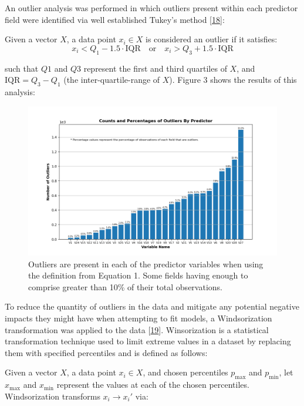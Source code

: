 \documentclass[11pt, oneside]{article}   	%
\begin{document}
An outlier analysis was performed in which outliers present within each predictor field were identified via well established Tukey's method [\href{https://books.google.com/books/about/Exploratory_Data_Analysis.html?id=UT9dAAAAIAAJ}{18}]: 

Given a vector $X$, a data point $x_i \in X$ is considered an outlier if it satisfies:
\begin{equation}
x_i < Q_1 - 1.5 \cdot \text{IQR} \quad \text{or} \quad x_i > Q_3 + 1.5 \cdot \text{IQR}
\end{equation}

such that $Q1$ and $Q3$ represent the first and third quartiles of $X$, and $\text{IQR} = Q_3 - Q_1$ (the inter-quartile-range of $X$). Figure 3 shows the results of this analysis:

\begin{figure}[h!]
    \centering
    \includegraphics[width=1.0\textwidth]{figures/fig_3.png}
    \captionsetup{font=small} 
    \caption{Outliers are present in each of the predictor variables when using the definition from Equation 1. Some fields having enough to comprise greater than 10\% of their total observations.}
    \label{fig3}
\end{figure}

To reduce the quantity of outliers in the data and mitigate any potential negative impacts they might have when attempting to fit models, a Windsorization transformation was applied to the data [\href{https://doi.org/10.1214/aoms/1177730388}{19}]. Winsorization is a statistical transformation technique used to limit extreme values in a dataset by replacing them with specified percentiles and is defined as follows:

Given a vector $X$, a data point $x_i \in X$, and chosen percentiles $p_{\text{max}}$ and $p_{\text{min}}$, let $x_{\text{max}}$ and  $x_{\text{min}}$ represent the values at each of the chosen percentiles. Windsorization transforms $x_i \rightarrow x_i'$ via:
\end{document}
